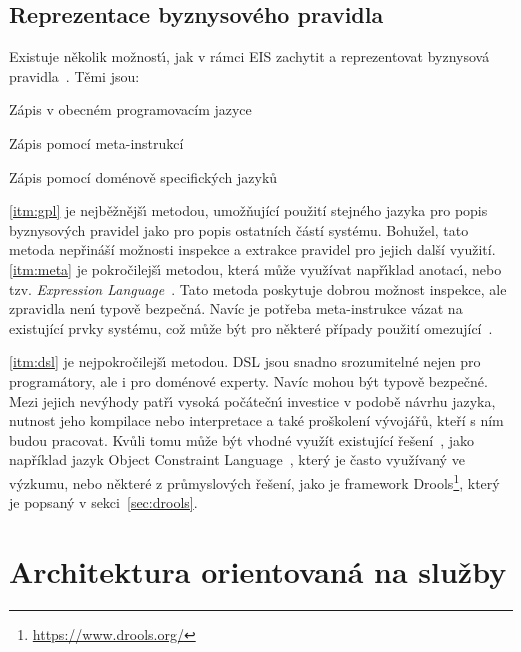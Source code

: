 \subsection{Reprezentace byznysového pravidla}\label{sec:business-rule-representation}

Existuje několik možnost\'{\i}, jak v rámci \gls{EIS} zachytit a reprezentovat byznysová
pravidla~\cite{cemus2015automated}. Těmi jsou:

\benum[label=\circledAlph]
    \item\label{itm:gpl} Zápis v obecném programovacím jazyce
    \item\label{itm:meta} Zápis pomocí meta-instrukcí
    \item\label{itm:dsl} Zápis pomocí doménově specifických jazyků
\eenum

\ref{itm:gpl} je nejběžnějš\'{\i} metodou, umožňující použití stejného jazyka pro popis byznysových pravidel jako
pro popis ostatních částí systému. Bohužel, tato metoda nepřináší možnosti inspekce a extrakce pravidel pro jejich další využití.
\ref{itm:meta} je pokročilejš\'{\i} metodou, která může využívat např\'{\i}klad anotac\'{\i}, nebo tzv. \textit{Expression
Language}~\cite{nemuraite2008representation}. Tato metoda poskytuje dobrou možnost inspekce, ale zpravidla nen\'{\i} typově bezpečná.
Navíc je potřeba meta-instrukce vázat na existující prvky systému, což může být pro některé případy použití omezující~\cite{cemus2015automated}.

\ref{itm:dsl} je nejpokročilejš\'{\i} metodou. \gls{DSL} jsou snadno srozumitelné nejen pro programátory, ale i pro doménové experty.
Navíc mohou b\'yt typově bezpečné. Mezi jejich nev\'yhody patř\'{\i} vysoká počátečn\'{\i} investice v podobě návrhu jazyka, nutnost
jeho kompilace nebo interpretace a také proškolení vývojářů, kteří s ním budou pracovat. Kvůli tomu může být vhodné využít
existující řešení~\cite{cemus2015automated}, jako například jazyk Object Constraint Language~\cite{warmer1998object},
který je často využívaný ve výzkumu, nebo některé z průmyslových řešení, jako je framework Drools\footnote{\url{https://www.drools.org/}},
který je popsaný v sekci~\ref{sec:drools}.

\section{Architektura orientovaná na služby}\label{sec:soa}

